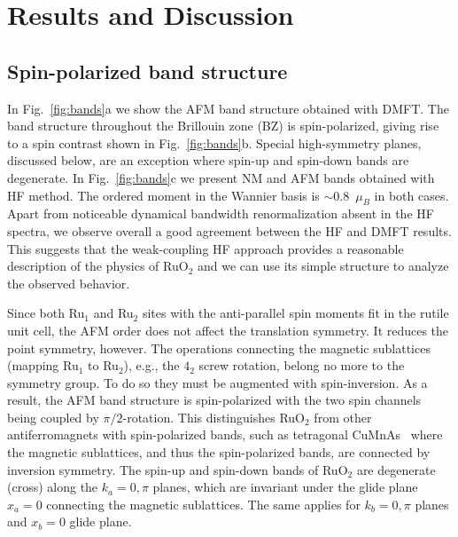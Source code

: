 \documentclass[reprint,twocolumn,superscriptaddress,secnumarabic,amssymb, nobibnotes, aps, prb]{revtex4-1}
\begin{document}

\section{Results and Discussion}
\subsection{Spin-polarized band structure} 
In Fig.~\ref{fig:bands}a we show the AFM band structure obtained with DMFT. The band structure throughout the Brillouin zone (BZ) is spin-polarized, 
giving rise to a spin contrast shown in Fig.~\ref{fig:bands}b. Special
high-symmetry planes, discussed below, are an exception where spin-up and spin-down bands are degenerate.
In Fig.~\ref{fig:bands}c we present NM and AFM bands obtained with HF method. The ordered moment in the Wannier basis is $\sim0.8$~$\mu_B$ in both cases. Apart from noticeable dynamical bandwidth renormalization absent in the HF spectra, we observe overall a good agreement between the HF and DMFT results. This suggests that the weak-coupling HF approach provides a reasonable description of the physics of RuO$_2$ and we can use its simple structure to analyze the observed behavior.



Since both Ru$_1$ and Ru$_2$ sites with the anti-parallel spin moments fit in the rutile unit cell,
the AFM order does not affect the translation symmetry. It reduces the point symmetry, however. The operations connecting the magnetic sublattices (mapping Ru$_1$ to Ru$_2$), e.g., the $4_2$ screw rotation, belong no more to the symmetry group. To do so they must be augmented with spin-inversion. 
As a result, the AFM band structure is spin-polarized with the two spin channels being coupled by $\pi/2$-rotation. This distinguishes RuO$_2$ from other antiferromagnets with spin-polarized bands, such as tetragonal CuMnAs~\cite{Wadley2013} where the magnetic sublattices, and thus the spin-polarized bands, are connected by inversion symmetry. The spin-up and spin-down bands of RuO$_2$ are degenerate (cross) along the $k_a=0,\pi$ planes, which are invariant under the glide plane $x_a=0$ connecting 
the magnetic sublattices. The same applies for $k_b=0,\pi$ planes and $x_b=0$ glide plane.
\end{document}
